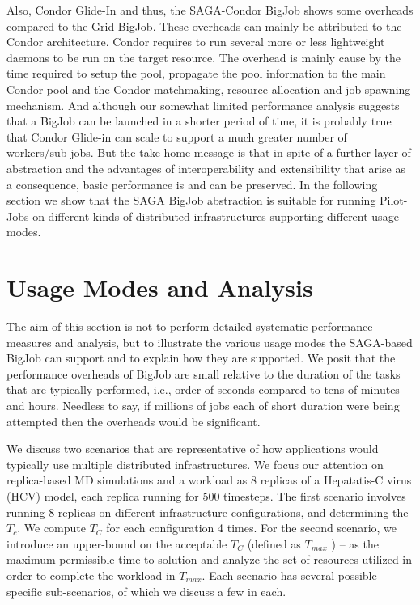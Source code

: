 \documentclass[conference,final]{IEEEtran}
\newcommand{\up}{\vspace*{-1em}}
\newcommand{\numrep}{8 }
\newcommand{\samplenum}{4 }
\newcommand{\tmax}{$T_{max}$ }
\newcommand{\tc}{$T_{C}$ }
\newcommand{\jhanote}[1]{ {\textcolor{red} { ***SJ: #1 }}}
\newcommand{\jhanote}[1]{}
\begin{document}
Also, Condor Glide-In and thus, the SAGA-Condor BigJob shows some
overheads compared to the Grid BigJob. These overheads can mainly be
attributed to the Condor architecture. Condor requires to run several
more or less lightweight daemons to be run on the target resource. The
overhead is mainly cause by the time required to setup the pool,
propagate the pool information to the main Condor pool and the Condor
matchmaking, resource allocation and job spawning mechanism. And
although our somewhat limited performance analysis suggests that a
BigJob can be launched in a shorter period of time, it is probably
true that Condor Glide-in can scale to support a much greater number
of workers/sub-jobs. But the take home message is that in spite of a
further layer of abstraction and the advantages of interoperability
and extensibility that arise as a consequence, basic performance is
and can be preserved.  In the following section we show that the SAGA
BigJob abstraction is suitable for running Pilot-Jobs on different
kinds of distributed infrastructures supporting different usage modes.


\up
\section{Usage Modes and Analysis}
\up

The aim of this section is not to perform detailed systematic
performance measures and analysis, but to illustrate the various usage
modes the SAGA-based BigJob can support and to explain how they are supported. We
posit that the performance overheads of BigJob are small relative to
the duration of the tasks that are typically performed, i.e., order of
seconds compared to tens of minutes and hours.  Needless to say, if
millions of jobs each of short duration were being attempted then the
overheads would be significant.

We discuss two scenarios that are representative of how applications
would typically use multiple distributed infrastructures. We focus our
attention on replica-based MD simulations and a workload as \numrep
replicas of a Hepatatis-C virus (HCV) model, each replica running for
500 timesteps.  The first scenario involves running \numrep replicas
on different infrastructure configurations, and determining the
$T_c$. We compute \tc for each configuration \samplenum times.  For
the second scenario, we introduce an upper-bound on the acceptable \tc
(defined as \tmax) -- as the maximum permissible time to solution and
analyze the set of resources utilized in order to complete the
workload in $T_{max}$. Each scenario has several possible specific
sub-scenarios, of which we discuss a few in each.
\end{document}
